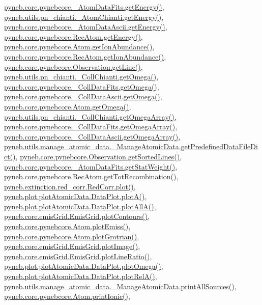 \hyperlink{pynebcore_8py_source_l00268}{pyneb.\+core.\+pynebcore.\+\_\+\+Atom\+Data\+Fits.\+get\+Energy()}, \hyperlink{pn__chianti_8py_source_l00346}{pyneb.\+utils.\+pn\+\_\+chianti.\+\_\+\+Atom\+Chianti.\+get\+Energy()}, \hyperlink{pynebcore_8py_source_l00525}{pyneb.\+core.\+pynebcore.\+\_\+\+Atom\+Data\+Ascii.\+get\+Energy()}, \hyperlink{pynebcore_8py_source_l02811}{pyneb.\+core.\+pynebcore.\+Rec\+Atom.\+get\+Energy()}, \hyperlink{pynebcore_8py_source_l02110}{pyneb.\+core.\+pynebcore.\+Atom.\+get\+Ion\+Abundance()}, \hyperlink{pynebcore_8py_source_l02961}{pyneb.\+core.\+pynebcore.\+Rec\+Atom.\+get\+Ion\+Abundance()}, \hyperlink{pynebcore_8py_source_l03543}{pyneb.\+core.\+pynebcore.\+Observation.\+get\+Line()}, \hyperlink{pn__chianti_8py_source_l00484}{pyneb.\+utils.\+pn\+\_\+chianti.\+\_\+\+Coll\+Chianti.\+get\+Omega()}, \hyperlink{pynebcore_8py_source_l00811}{pyneb.\+core.\+pynebcore.\+\_\+\+Coll\+Data\+Fits.\+get\+Omega()}, \hyperlink{pynebcore_8py_source_l01063}{pyneb.\+core.\+pynebcore.\+\_\+\+Coll\+Data\+Ascii.\+get\+Omega()}, \hyperlink{pynebcore_8py_source_l01262}{pyneb.\+core.\+pynebcore.\+Atom.\+get\+Omega()}, \hyperlink{pn__chianti_8py_source_l00461}{pyneb.\+utils.\+pn\+\_\+chianti.\+\_\+\+Coll\+Chianti.\+get\+Omega\+Array()}, \hyperlink{pynebcore_8py_source_l00783}{pyneb.\+core.\+pynebcore.\+\_\+\+Coll\+Data\+Fits.\+get\+Omega\+Array()}, \hyperlink{pynebcore_8py_source_l01039}{pyneb.\+core.\+pynebcore.\+\_\+\+Coll\+Data\+Ascii.\+get\+Omega\+Array()}, \hyperlink{manage__atomic__data_8py_source_l00034}{pyneb.\+utils.\+manage\+\_\+atomic\+\_\+data.\+\_\+\+Manage\+Atomic\+Data.\+get\+Predefined\+Data\+File\+Dict()}, \hyperlink{pynebcore_8py_source_l03562}{pyneb.\+core.\+pynebcore.\+Observation.\+get\+Sorted\+Lines()}, \hyperlink{pynebcore_8py_source_l00242}{pyneb.\+core.\+pynebcore.\+\_\+\+Atom\+Data\+Fits.\+get\+Stat\+Weight()}, \hyperlink{pynebcore_8py_source_l02735}{pyneb.\+core.\+pynebcore.\+Rec\+Atom.\+get\+Tot\+Recombination()}, \hyperlink{red__corr_8py_source_l00303}{pyneb.\+extinction.\+red\+\_\+corr.\+Red\+Corr.\+plot()}, \hyperlink{plot_atomic_data_8py_source_l00116}{pyneb.\+plot.\+plot\+Atomic\+Data.\+Data\+Plot.\+plot\+A()}, \hyperlink{plot_atomic_data_8py_source_l00188}{pyneb.\+plot.\+plot\+Atomic\+Data.\+Data\+Plot.\+plot\+All\+A()}, \hyperlink{emis_grid_8py_source_l00179}{pyneb.\+core.\+emis\+Grid.\+Emis\+Grid.\+plot\+Contours()}, \hyperlink{pynebcore_8py_source_l02313}{pyneb.\+core.\+pynebcore.\+Atom.\+plot\+Emiss()}, \hyperlink{pynebcore_8py_source_l02372}{pyneb.\+core.\+pynebcore.\+Atom.\+plot\+Grotrian()}, \hyperlink{emis_grid_8py_source_l00137}{pyneb.\+core.\+emis\+Grid.\+Emis\+Grid.\+plot\+Image()}, \hyperlink{emis_grid_8py_source_l00238}{pyneb.\+core.\+emis\+Grid.\+Emis\+Grid.\+plot\+Line\+Ratio()}, \hyperlink{plot_atomic_data_8py_source_l00372}{pyneb.\+plot.\+plot\+Atomic\+Data.\+Data\+Plot.\+plot\+Omega()}, \hyperlink{plot_atomic_data_8py_source_l00261}{pyneb.\+plot.\+plot\+Atomic\+Data.\+Data\+Plot.\+plot\+Rel\+A()}, \hyperlink{manage__atomic__data_8py_source_l00431}{pyneb.\+utils.\+manage\+\_\+atomic\+\_\+data.\+\_\+\+Manage\+Atomic\+Data.\+print\+All\+Sources()}, \hyperlink{pynebcore_8py_source_l02167}{pyneb.\+core.\+pynebcore.\+Atom.\+print\+Ionic()}, 